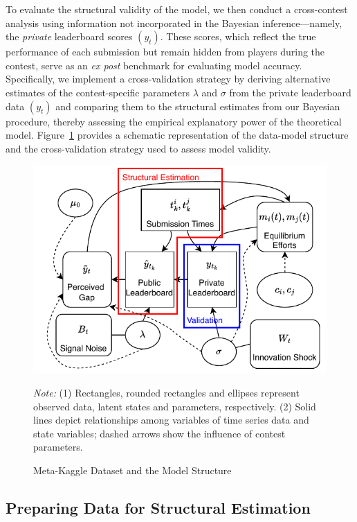 \documentclass[mnsc]{informs3}
\begin{document}
To evaluate the structural validity of the model, we then conduct a cross-contest analysis using information not incorporated in the Bayesian inference—namely, the \textit{private} leaderboard scores $(y_t)$. 
These scores, which reflect the true performance of each submission but remain hidden from players during the contest, serve as an \textit{ex post} benchmark for evaluating model accuracy.
Specifically, we implement a cross-validation strategy by deriving alternative estimates of the contest-specific parameters $\lambda$ and $\sigma$ from the private leaderboard data $(y_t)$ and comparing them to the structural estimates from our Bayesian procedure, thereby assessing the empirical explanatory power of the theoretical model.
Figure~\ref{kaggledata-diagram} provides a schematic representation of the data-model structure and the cross-validation strategy used to assess model validity.

\begin{figure}[!ht]
	\centering
	\noindent\includegraphics[scale=1.2]{kaggledata_diagram.pdf}
	\caption{Meta-Kaggle Dataset and the Model Structure}
	\label{kaggledata-diagram}
	\begin{minipage}{\textwidth}
{\footnotesize
\medskip
\textit{Note:} (1) Rectangles, rounded rectangles and ellipses represent observed data, latent states and parameters, respectively. 
(2) Solid lines depict relationships among variables of time series data and state variables; dashed arrows show the influence of contest parameters. 
}
\end{minipage}
\end{figure}


\subsection{Preparing Data for Structural Estimation}
\end{document}
